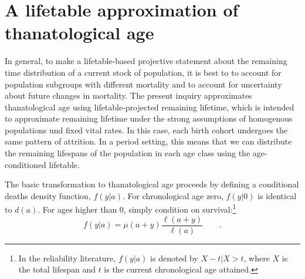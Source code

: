 \documentclass{article}
\newcommand{\ep}{\quad\quad\text{.}}
\begin{document}
\section*{A lifetable approximation of thanatological age}
In general, to make a lifetable-based projective statement about the remaining
time distribution of a current stock of population, it is best to to account for population subgroups
with different mortality and to account for uncertainty about future changes in
mortality.
The present inquiry approximates thanatological age using lifetable-projected remaining lifetime,
which is intended to approximate remaining lifetime under the strong
assumptions of homogenous populations und fixed vital rates. 
In this case, each birth cohort undergoes the same
pattern of attrition. In a period setting, this means that we can distribute the
remaining lifespans of the population in each age class using the
age-conditioned lifetable.

The basic transformation to thanatological age proceeds by defining a
conditional deaths density function, $f(y|a)$. For chronological
age zero, $f(y|0)$ is identical to $d(a)$. For ages higher than 0, simply
condition on survival:\footnote{In the reliability literature, $f(y|a)$ is
denoted by $ X - t | X > t $, where $X$ is the total lifespan and $t$ is the
current chronological age attained.}
\begin{equation}
\label{eq:vaupel1}
f(y | a) = \mu(a+y)\frac{\ell(a+y)}{\ell(a)} \ep
\end{equation}
\end{document}
